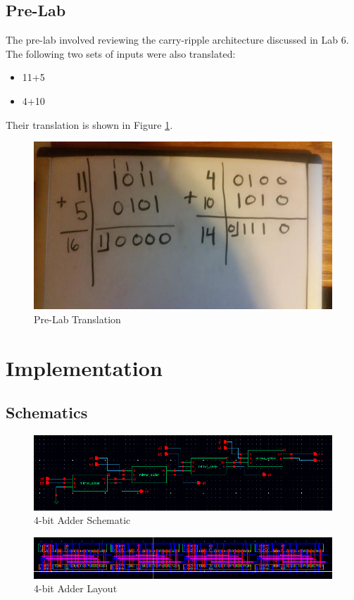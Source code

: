 \documentclass[12pt]{article}
\begin{document}
\subsection{Pre-Lab}
The pre-lab involved reviewing the carry-ripple architecture discussed in Lab 6. The following two sets of inputs were also translated:
\begin{itemize}
	\item 11+5
	\item 4+10
\end{itemize} 

\noindent Their translation is shown in Figure \ref{fig:prelab}.

\begin{figure}[H]
\centering
\includegraphics[width=0.7\linewidth]{prelab}
\caption{Pre-Lab Translation}
\label{fig:prelab}
\end{figure}


\section{Implementation}
\subsection{Schematics}
\begin{figure}[H]
\centering
\includegraphics[width=\linewidth]{schematic}
\caption{4-bit Adder Schematic}
\label{fig:schematic}
\end{figure}

\begin{figure}[H]
\centering
\includegraphics[width=1\linewidth]{layout}
\caption{4-bit Adder Layout}
\label{fig:layout}
\end{figure}
\end{document}
